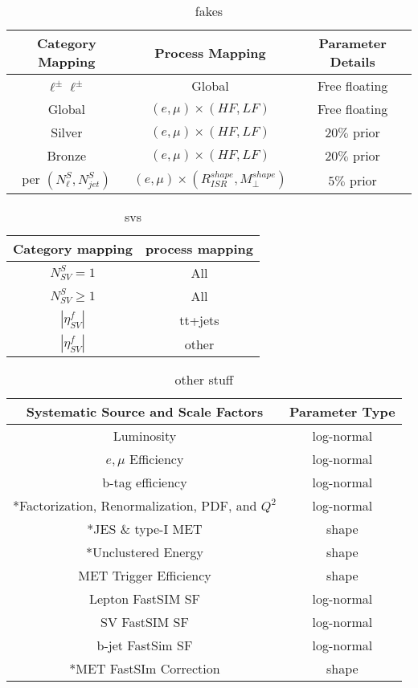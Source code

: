 \begin{table}
\caption{fakes}
\begin{tabular}{ccc}

Category Mapping & Process Mapping & Parameter Details \\ 
\hline 
\hline
$\ell^\pm\ell^\pm$ & Global & Free floating \\ 
 
Global & $(e,\mu)\times(HF,LF)$ & Free floating \\ 
 
Silver & $(e,\mu)\times(HF,LF)$ & $20\%$ prior \\ 
 
Bronze & $(e,\mu)\times(HF,LF)$ & $20\%$ prior \\ 
 
per $(N_\ell^S,N_{jet}^S)$ & $(e,\mu)\times(R_{ISR}^{shape}, M_\perp^{shape})$ & $5\%$ prior \\ 
\hline 
\end{tabular} 
\label{tab:fakenuisance}

\end{table}


\begin{table}
\caption{svs}
\begin{tabular}{cc}
Category mapping & process mapping \\ 
\hline 
\hline
$N_{SV}^S=1$ & All \\ 
 
$N_{SV}^S \geq 1$ & All \\ 
 
$|\eta_{SV}^f|$ & tt+jets \\ 
 
$|\eta_{SV}^f|$ & other \\ 
\hline 
\end{tabular} 
\label{tab:svnuisance}

\end{table}

\begin{table}
\caption{other stuff}
\begin{tabular}{|c|c|}
\hline 
Systematic Source and Scale Factors & Parameter Type \\ 
\hline 
Luminosity & log-normal \\  
$e,\mu$ Efficiency & log-normal \\ 
b-tag efficiency & log-normal \\ 
*Factorization, Renormalization, PDF, and $Q^2$ & log-normal \\ 
*JES \& type-I MET & shape \\ 
*Unclustered Energy & shape \\ 
MET Trigger Efficiency & shape \\ 
Lepton FastSIM SF & log-normal \\ 
SV FastSIM SF & log-normal \\ 
b-jet FastSim SF & log-normal \\ 
*MET FastSIm Correction & shape \\ 
\hline 
\end{tabular} 
\label{tab:othernuisance}

\end{table}


